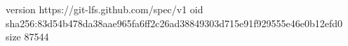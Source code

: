 version https://git-lfs.github.com/spec/v1
oid sha256:83d54b478da38aae965fa6ff2c26ad38849303d715e91f929555e46e0b12efd0
size 87544
